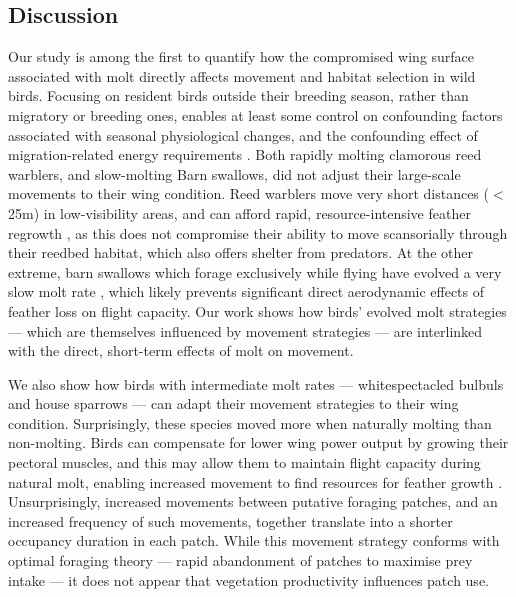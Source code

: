 \begin{refsection}
\section*{Discussion}

Our study is among the first to quantify how the compromised wing surface associated with molt directly affects movement and habitat selection in wild birds.
Focusing on resident birds outside their breeding season, rather than migratory or breeding ones, enables at least some control on confounding factors associated with seasonal physiological changes, and the confounding effect of migration-related energy requirements \cite{alerstam1990,wikelski2003,horvitz2014}.
Both rapidly molting clamorous reed warblers, and slow-molting Barn swallows, did not adjust their large-scale movements to their wing condition.
Reed warblers move very short distances ($<$ 25m) in low-visibility areas, and can afford rapid, resource-intensive feather regrowth \citep{lindstrom1993,newton2009,kiat2017}, as this does not compromise their ability to move scansorially through their reedbed habitat, which also offers shelter from predators.
At the other extreme, barn swallows which forage exclusively while flying have evolved a very slow molt rate \cite{kiat2016}, which likely prevents significant direct aerodynamic effects of feather loss on flight capacity.
Our work shows how birds' evolved molt strategies --- which are themselves influenced by movement strategies \cite{kiat2016} --- are interlinked with the direct, short-term effects of molt on movement.

We also show how birds with intermediate molt rates --- whitespectacled bulbuls and house sparrows --- can adapt their movement strategies to their wing condition.
Surprisingly, these species moved more when naturally molting than non-molting.
Birds can compensate for lower wing power output by growing their pectoral muscles, and this may allow them to maintain flight capacity during natural molt, enabling increased movement to find resources for feather growth \cite{chai1997,swaddle1997}.
Unsurprisingly, increased movements between putative foraging patches, and an increased frequency of such movements, together translate into a shorter occupancy duration in each patch.
While this movement strategy conforms with optimal foraging theory --- rapid abandonment of patches to maximise prey intake \cite{charnov1976} --- it does not appear that vegetation productivity influences patch use.


\end{refsection}
